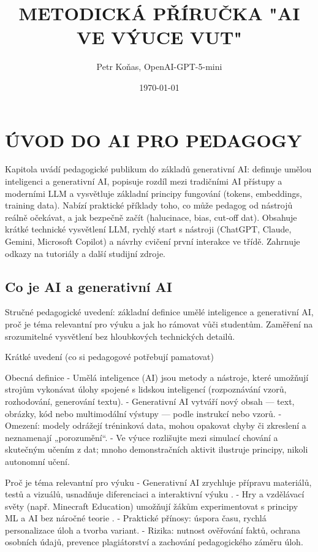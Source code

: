 \documentclass{report}%
\title{METODICKÁ PŘÍRUČKA "AI VE VÝUCE VUT"}%
\author{Petr Koňas, OpenAI{-}GPT{-}5{-}mini}%
\date{\today}%
\begin{document}
%
\normalsize%
%
\hypersetup{pageanchor=false}%
%
\maketitle%
\tableofcontents%
\clearpage%
\hypersetup{pageanchor=true}%
%
\chapter{ÚVOD DO AI PRO PEDAGOGY}%
Kapitola uvádí pedagogické publikum do základů generativní AI: definuje umělou inteligenci a generativní AI, popisuje rozdíl mezi tradičními AI přístupy a moderními LLM a vysvětluje základní principy fungování (tokens, embeddings, training data). Nabízí praktické příklady toho, co může pedagog od nástrojů reálně očekávat, a jak bezpečně začít (halucinace, bias, cut‑off dat). Obsahuje krátké technické vysvětlení LLM, rychlý start s nástroji (ChatGPT, Claude, Gemini, Microsoft Copilot) a návrhy cvičení první interakce ve třídě. Zahrnuje odkazy na tutoriály a další studijní zdroje.%
\section{Co je AI a generativní AI}%
Stručné pedagogické uvedení: základní definice umělé inteligence a generativní AI, proč je téma relevantní pro výuku a jak ho rámovat vůči studentům. Zaměření na srozumitelné vysvětlení bez hloubkových technických detailů.%


%
Krátké uvedení (co si pedagogové potřebují pamatovat)

Obecná definice
- Umělá inteligence (AI) jsou metody a nástroje, které umožňují strojům vykonávat úlohy spojené s lidskou inteligencí (rozpoznávání vzorů, rozhodování, generování textu).
- Generativní AI vytváří nový obsah — text, obrázky, kód nebo multimodální výstupy — podle instrukcí nebo vzorů.
- Omezení: modely odrážejí tréninková data, mohou opakovat chyby či zkreslení a neznamenají „porozumění“.
- Ve výuce rozlišujte mezi simulací chování a skutečným učením z dat; mnoho demonstračních aktivit ilustruje principy, nikoli autonomní učení.

Proč je téma relevantní pro výuku
- Generativní AI zrychluje přípravu materiálů, testů a vizuálů, usnadňuje diferenciaci a interaktivní výuku \cite{kb_ai_101_tipu_pdf_04e4a115_page_36_1}.
- Hry a vzdělávací světy (např. Minecraft Education) umožňují žákům experimentovat s principy ML a AI bez náročné teorie \cite{kb_ai_101_tipu_pdf_04e4a115_page_15_2}.
- Praktické přínosy: úspora času, rychlá personalizace úloh a tvorba variant.
- Rizika: nutnost ověřování faktů, ochrana osobních údajů, prevence plagiátorství a zachování pedagogického záměru úloh.
\end{document}
